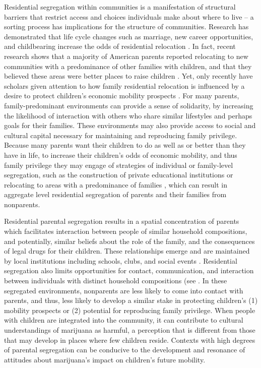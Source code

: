 Residential segregation within communities is a manifestation of structural barriers that restrict access and choices individuals make about where to live -- a sorting process has implications for the structure of communities. Research has demonstrated that life cycle changes such as marriage, new career opportunities, and childbearing increase the odds of residential relocation \citep{clark_et_al_1994,rossi_and_shlay_1982,rossi_1980,davanzo_1976,clark_and_davies-withers_1999,dieleman_et_al_1995}. In fact, recent research shows that a majority of American parents reported relocating to new communities with a predominance of other families with children, and that they believed these areas were better places to raise children \citep{taylor_et_al_2008,clark_and_davies-withers_1999,rossi_and_shlay_1982}. Yet, only recently have scholars given attention to how family residential relocation is influenced by a desire to protect children's economic mobility prospects \citep{owens_2016,beisel_1997}. For many parents, family-predominant environments can provide a sense of solidarity, by increasing the likelihood of interaction with others who share similar lifestyles and perhaps goals for their families. These environments may also provide access to social and cultural capital necessary for maintaining and reproducing family privilege. Because many parents want their children to do as well as or better than they have in life, to increase their children's odds of economic mobility, and thus family privilege they may engage of strategies of individual or family-level segregation, such as the construction of private educational institutions \citep{andrews_2002,nevin_and_bills_1976} or relocating to areas with a predominance of families \citep{owens_2016}, which can result in aggregate level residential segregation of parents and their families from nonparents. 



Residential parental segregation results in a spatial concentration of parents which facilitates interaction between people of similar household compositions, and potentially, similar beliefs about the role of the family, and the consequences of legal drugs for their children. These relationships emerge and are maintained by local institutions including schools, clubs, and social events \citep{beisel_1997}. Residential segregation also limits opportunities for contact, communication, and interaction between individuals with distinct household compositions (see \citep{blau_1977b,blau_1977a}. In these segregated environments, nonparents are less likely to come into contact with parents, and thus, less likely to develop a similar stake in protecting children's (1) mobility prospects or (2) potential for reproducing family privilege. When people with children are integrated into the community, it can contribute to cultural understandings of marijuana as harmful, a perception that is different from those that may develop in places where few children reside. Contexts with high degrees of parental segregation can be conducive to the development and resonance of attitudes about marijuana's impact on children's future mobility.

